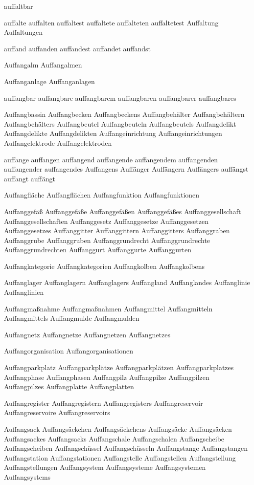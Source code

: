 auffaltbar 

auffalte
auffalten
auffaltest
auffaltete
auffalteten
auffaltetest
Auffaltung
Auffaltungen

auffand
auffanden
auffandest 
auffandet 
auffandst

Auffangalm
Auffangalmen

Auffanganlage
Auffanganlagen

auffangbar
auffangbare
auffangbarem
auffangbaren
auffangbarer
auffangbares

Auffangbassin
Auffangbecken
Auffangbeckens
Auffangbehälter
Auffangbehältern
Auffangbehälters
Auffangbeutel
Auffangbeuteln
Auffangbeutels
Auffangdelikt
Auffangdelikte
Auffangdelikten
Auffangeinrichtung
Auffangeinrichtungen
Auffangelektrode
Auffangelektroden

auffange
auffangen
auffangend
auffangende
auffangendem
auffangenden
auffangender
auffangendes
Auffangens
Auffänger
Auffängern
Auffängers
auffängst
auffangt
auffängt

Auffangfläche
Auffangflächen
Auffangfunktion
Auffangfunktionen

Auffanggefäß
Auffanggefäße
Auffanggefäßen
Auffanggefäßes
Auffanggesellschaft
Auffanggesellschaften
Auffanggesetz
Auffanggesetze
Auffanggesetzen
Auffanggesetzes
Auffanggitter
Auffanggittern
Auffanggitters
Auffanggraben
Auffanggrube
Auffanggruben
Auffanggrundrecht
Auffanggrundrechte
Auffanggrundrechten
Auffanggurt
Auffanggurte
Auffanggurten

Auffangkategorie
Auffangkategorien
Auffangkolben
Auffangkolbens

Auffanglager
Auffanglagern
Auffanglagers
Auffangland
Auffanglandes
Auffanglinie
Auffanglinien

Auffangmaßnahme
Auffangmaßnahmen
Auffangmittel
Auffangmitteln
Auffangmittels
Auffangmulde
Auffangmulden

Auffangnetz
Auffangnetze
Auffangnetzen
Auffangnetzes

Auffangorganisation
Auffangorganisationen

Auffangparkplatz
Auffangparkplätze
Auffangparkplätzen
Auffangparkplatzes
Auffangphase
Auffangphasen
Auffangpilz
Auffangpilze
Auffangpilzen
Auffangpilzes
Auffangplatte
Auffangplatten

Auffangregister
Auffangregistern
Auffangregisters
Auffangreservoir
Auffangreservoire
Auffangreservoirs

Auffangsack
Auffangsäckchen
Auffangsäckchens
Auffangsäcke
Auffangsäcken
Auffangsackes
Auffangsacks
Auffangschale
Auffangschalen
Auffangscheibe
Auffangscheiben
Auffangschüssel
Auffangschüsseln
Auffangstange
Auffangstangen
Auffangstation
Auffangstationen
Auffangstelle
Auffangstellen
Auffangstellung
Auffangstellungen
Auffangsystem
Auffangsysteme
Auffangsystemen
Auffangsystems

